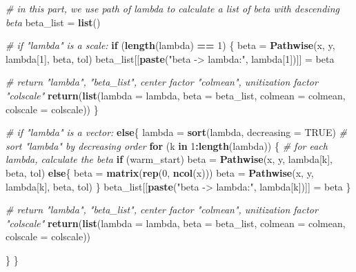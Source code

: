 \documentclass[
]{article}
\newenvironment{Shaded}{\begin{snugshade}}{\end{snugshade}}
\newcommand{\AttributeTok}[1]{\textcolor[rgb]{0.13,0.29,0.53}{#1}}
\newcommand{\CommentTok}[1]{\textcolor[rgb]{0.56,0.35,0.01}{\textit{#1}}}
\newcommand{\ConstantTok}[1]{\textcolor[rgb]{0.56,0.35,0.01}{#1}}
\newcommand{\ControlFlowTok}[1]{\textcolor[rgb]{0.13,0.29,0.53}{\textbf{#1}}}
\newcommand{\DecValTok}[1]{\textcolor[rgb]{0.00,0.00,0.81}{#1}}
\newcommand{\FunctionTok}[1]{\textcolor[rgb]{0.13,0.29,0.53}{\textbf{#1}}}
\newcommand{\NormalTok}[1]{#1}
\newcommand{\OtherTok}[1]{\textcolor[rgb]{0.56,0.35,0.01}{#1}}
\newcommand{\SpecialCharTok}[1]{\textcolor[rgb]{0.81,0.36,0.00}{\textbf{#1}}}
\newcommand{\StringTok}[1]{\textcolor[rgb]{0.31,0.60,0.02}{#1}}
\begin{document}
\begin{Shaded}
\begin{Highlighting}[]
  
  \CommentTok{\# in this part, we use path of lambda to calculate a list of beta with descending beta}
\NormalTok{  beta\_list }\OtherTok{=} \FunctionTok{list}\NormalTok{()}
  
  \CommentTok{\# if "lambda" is a scale:}
  \ControlFlowTok{if}\NormalTok{ (}\FunctionTok{length}\NormalTok{(lambda) }\SpecialCharTok{==} \DecValTok{1}\NormalTok{) \{}
\NormalTok{    beta }\OtherTok{=} \FunctionTok{Pathwise}\NormalTok{(x, y, lambda[}\DecValTok{1}\NormalTok{], beta, tol)}
\NormalTok{    beta\_list[[}\FunctionTok{paste}\NormalTok{(}\StringTok{"beta {-}\textgreater{} lambda:"}\NormalTok{, lambda[}\DecValTok{1}\NormalTok{])]] }\OtherTok{=}\NormalTok{ beta}
    
    \CommentTok{\# return "lambda", "beta\_list", center factor "colmean", unitization factor "colscale"}
    \FunctionTok{return}\NormalTok{(}\FunctionTok{list}\NormalTok{(}\AttributeTok{lambda =}\NormalTok{ lambda, }\AttributeTok{beta =}\NormalTok{ beta\_list, }\AttributeTok{colmean =}\NormalTok{ colmean, }\AttributeTok{colscale =}\NormalTok{ colscale)) }
\NormalTok{  \}}
  
  \CommentTok{\# if "lambda" is a vector:}
  \ControlFlowTok{else}\NormalTok{\{}
\NormalTok{    lambda }\OtherTok{=} \FunctionTok{sort}\NormalTok{(lambda, }\AttributeTok{decreasing =} \ConstantTok{TRUE}\NormalTok{) }\CommentTok{\# sort "lambda" by decreasing order}
    \ControlFlowTok{for}\NormalTok{ (k }\ControlFlowTok{in} \DecValTok{1}\SpecialCharTok{:}\FunctionTok{length}\NormalTok{(lambda)) \{ }\CommentTok{\# for each lambda, calculate the beta}
      \ControlFlowTok{if}\NormalTok{ (warm\_start)}
\NormalTok{        beta }\OtherTok{=} \FunctionTok{Pathwise}\NormalTok{(x, y, lambda[k], beta, tol)}
      \ControlFlowTok{else}\NormalTok{\{}
\NormalTok{        beta }\OtherTok{=} \FunctionTok{matrix}\NormalTok{(}\FunctionTok{rep}\NormalTok{(}\DecValTok{0}\NormalTok{, }\FunctionTok{ncol}\NormalTok{(x)))}
\NormalTok{        beta }\OtherTok{=} \FunctionTok{Pathwise}\NormalTok{(x, y, lambda[k], beta, tol)}
\NormalTok{      \}}
\NormalTok{      beta\_list[[}\FunctionTok{paste}\NormalTok{(}\StringTok{"beta {-}\textgreater{} lambda:"}\NormalTok{, lambda[k])]] }\OtherTok{=}\NormalTok{ beta}
\NormalTok{    \}}
    
    \CommentTok{\# return "lambda", "beta\_list", center factor "colmean", unitization factor "colscale"}
    \FunctionTok{return}\NormalTok{(}\FunctionTok{list}\NormalTok{(}\AttributeTok{lambda =}\NormalTok{ lambda, }\AttributeTok{beta =}\NormalTok{ beta\_list, }\AttributeTok{colmean =}\NormalTok{ colmean, }\AttributeTok{colscale =}\NormalTok{ colscale))}
    
\NormalTok{  \}}
\NormalTok{\}}
\end{Highlighting}
\end{Shaded}
\end{document}
